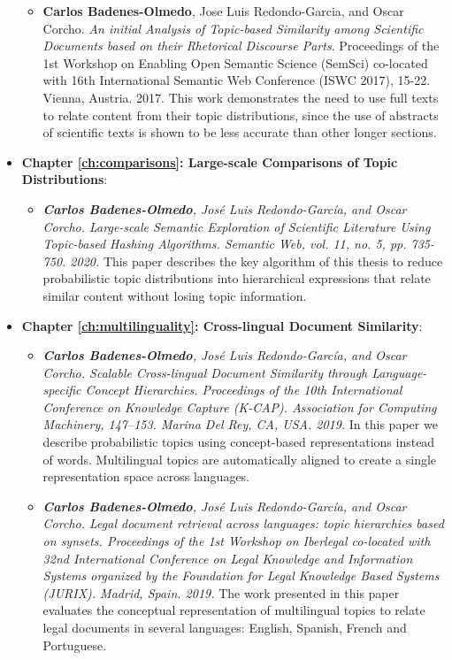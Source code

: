 \begin{itemize}
\begin{itemize}
\item \textbf{Carlos Badenes-Olmedo}, Jose Luis Redondo-Garcia, and Oscar Corcho. \textit{An initial Analysis of Topic-based Similarity among Scientific Documents based on their Rhetorical Discourse Parts}. Proceedings of the 1st Workshop on Enabling Open Semantic Science (SemSci) co-located with 16th International Semantic Web Conference (ISWC 2017), 15-22. Vienna, Austria. 2017. This work demonstrates the need to use full texts to relate content from their topic distributions, since the use of abstracts of scientific texts is shown to be less accurate than other longer sections. 
\end{itemize}
\item \textbf{Chapter \ref{ch:comparisons}: Large-scale Comparisons of Topic Distributions}:
\begin{itemize}
\item \textit{\textbf{Carlos Badenes-Olmedo}, José Luis Redondo-García, and Oscar Corcho. \textit{Large-scale Semantic Exploration of Scientific Literature Using Topic-based Hashing Algorithms}. Semantic Web, vol. 11, no. 5, pp. 735-750. 2020.} This paper describes the key algorithm of this thesis to reduce probabilistic topic distributions into hierarchical expressions that relate similar content without losing topic information.
\end{itemize}
\item \textbf{Chapter \ref{ch:multilinguality}: Cross-lingual Document Similarity}:
\begin{itemize}
\item \textit{\textbf{Carlos Badenes-Olmedo}, José Luis Redondo-García, and Oscar Corcho. \textit{Scalable Cross-lingual Document Similarity through Language-specific Concept Hierarchies}. Proceedings of the 10th International Conference on Knowledge Capture (K-CAP). Association for Computing Machinery, 147–153. Marina Del Rey, CA, USA. 2019.} In this paper we describe probabilistic topics using concept-based representations instead of words.  Multilingual topics are automatically aligned to create a single representation space across languages.   
\item \textit{\textbf{Carlos Badenes-Olmedo}, José Luis Redondo-García, and Oscar Corcho. \textit{Legal document retrieval across languages: topic hierarchies based on synsets}. Proceedings of the 1st Workshop on Iberlegal co-located with 32nd International Conference on Legal Knowledge and Information Systems organized by the Foundation for Legal Knowledge Based Systems (JURIX). Madrid, Spain. 2019.} The work presented in this paper evaluates the conceptual representation of multilingual topics to relate legal documents in several languages: English, Spanish, French and Portuguese.

\end{itemize}
\end{itemize}
